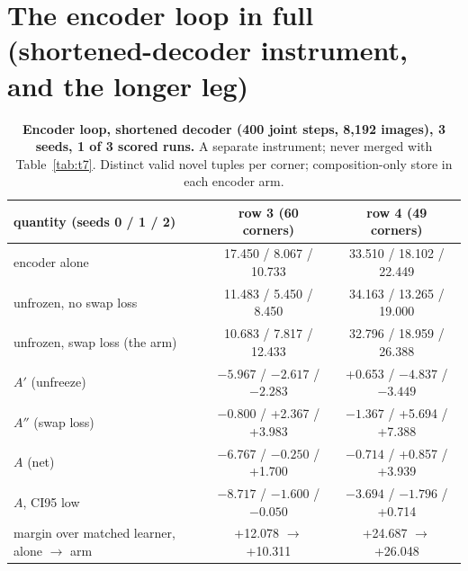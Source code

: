 \documentclass{article} %
\begin{document}
\section{The encoder loop in full (shortened-decoder instrument, and the longer leg)}
\label{app:encloop}

\begin{table}[h]
\centering\small
\caption{\textbf{Encoder loop, shortened decoder (400 joint steps, 8,192 images), 3 seeds, 1 of 3
scored runs.} A separate instrument; never merged with Table~\ref{tab:t7}. Distinct valid novel
tuples per corner; composition-only store in each encoder arm.}
\label{tab:encloop}
\setlength{\tabcolsep}{3pt}
\begin{tabular}{lcc}
\toprule
quantity (seeds 0 / 1 / 2) & row 3 (60 corners) & row 4 (49 corners) \\
\midrule
encoder alone & 17.450 / 8.067 / 10.733 & 33.510 / 18.102 / 22.449 \\
unfrozen, no swap loss & 11.483 / 5.450 / 8.450 & 34.163 / 13.265 / 19.000 \\
unfrozen, swap loss (the arm) & 10.683 / 7.817 / 12.433 & 32.796 / 18.959 / 26.388 \\
$A'$ (unfreeze) & $-5.967$ / $-2.617$ / $-2.283$ & +0.653 / $-4.837$ / $-3.449$ \\
$A''$ (swap loss) & $-0.800$ / +2.367 / +3.983 & $-1.367$ / +5.694 / +7.388 \\
$A$ (net) & $-6.767$ / $-0.250$ / +1.700 & $-0.714$ / +0.857 / +3.939 \\
$A$, CI95 low & $-8.717$ / $-1.600$ / $-0.050$ & $-3.694$ / $-1.796$ / +0.714 \\
margin over matched learner, alone $\to$ arm & +12.078 $\to$ +10.311 & +24.687 $\to$ +26.048 \\
\bottomrule
\end{tabular}
\end{table}
\end{document}
